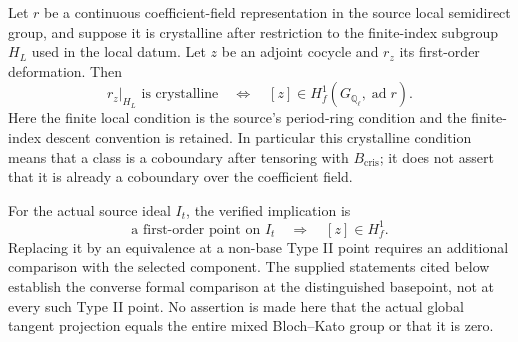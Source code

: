 \begin{proposition}
\label{AC-G47-crystalline}
Let $r$ be a continuous coefficient-field representation in
the source local semidirect group, and suppose it is crystalline
after restriction to the finite-index subgroup $H_L$ used in
the local datum.  Let $z$ be an adjoint cocycle and $r_z$ its
first-order deformation.  Then
\[
 r_z|_{H_L}\text{ is crystalline}
 \quad\Longleftrightarrow\quad
 [z]\in H^1_f(G_{\mathbb Q_\ell},\operatorname{ad}r).  \tag{G47.5}
\]
Here the finite local condition is the source's period-ring
condition and the finite-index descent convention is retained.
In particular this crystalline condition means that a class
is a coboundary after tensoring with $B_{\mathrm{cris}}$;
it does not assert that it is already a coboundary over the
coefficient field.

For the actual source ideal $I_t$, the verified implication is
\[
       \text{a first-order point on }I_t
                  \quad\Longrightarrow\quad [z]\in H^1_f.
                                                               \tag{G47.6}
\]
Replacing it by an equivalence at a non-base Type II point
requires an additional comparison with the selected component.
The supplied statements cited below establish the converse
formal comparison at the distinguished basepoint, not at
every such Type II point.  No assertion is made here that
the actual global tangent projection equals the entire mixed
Bloch--Kato group or that it is zero.
\end{proposition}
